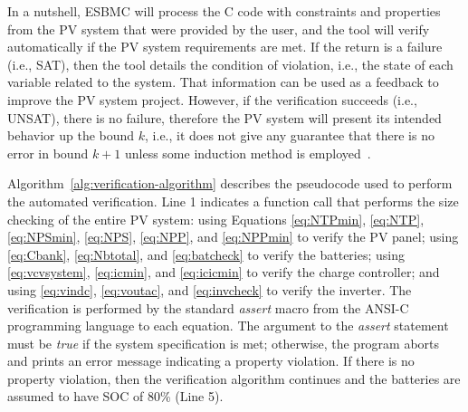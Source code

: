 \documentclass[journal]{IEEEtran}
\begin{document}
%
In a nutshell, ESBMC will process the C code with constraints %
and properties %
from the PV system that were provided by the user, and the tool will verify automatically if the PV system requirements are met. If the return is a failure (i.e., SAT), then the tool details the condition of violation, i.e., the state of each variable related to the system. That information can be used as a feedback to improve the PV system project. However, if the verification succeeds (i.e., UNSAT), there is no failure, therefore the PV system will present its intended behavior up the bound $k$, i.e., it does not give any guarantee that there is no error in bound $k+1$ unless some induction method is employed~\cite{DBLP:journals/sttt/GadelhaIC17}.
%
%
%
% 
%
%
%

Algorithm~\ref{alg:verification-algorithm} describes the pseudocode used to perform the automated verification. Line 1 indicates a function call that performs the size checking of the entire PV system: using Equations \eqref{eq:NTPmin}, \eqref{eq:NTP}, \eqref{eq:NPSmin}, \eqref{eq:NPS}, \eqref{eq:NPP}, and \eqref{eq:NPPmin} to verify the PV panel; using \eqref{eq:Cbank}, \eqref{eq:Nbtotal}, and \eqref{eq:batcheck} to verify the batteries; using \eqref{eq:vcvsystem}, \eqref{eq:icmin}, and \eqref{eq:icicmin} to verify the charge controller; and using \eqref{eq:vindc}, \eqref{eq:voutac}, and \eqref{eq:invcheck} to verify the inverter. The verification is performed by the standard \textit{assert} macro from the ANSI-C programming language to each equation. The argument to the \textit{assert} statement must be \textit{true} if the system specification is met; otherwise, the program aborts and prints an error message indicating a property violation. If there is no property violation, then the verification algorithm continues and the batteries are assumed to have SOC of 80\% (Line 5).
\end{document}
